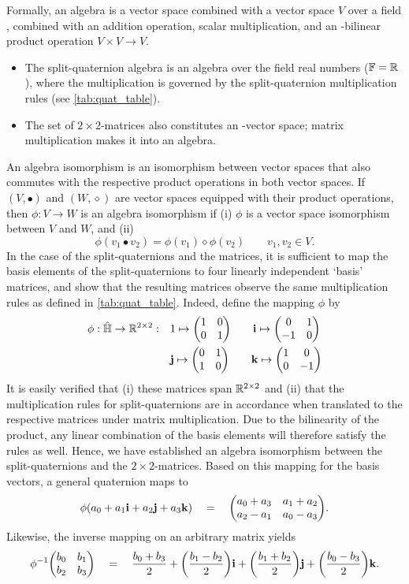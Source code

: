 Formally, an algebra is a vector space combined with a vector space $V$ over a field \field, combined with an addition operation, scalar multiplication, and an \field-bilinear product operation $V\times V \to V$. \cite{Schuller2014}
\begin{itemize}
    \item The split-quaternion algebra is an algebra over the field real numbers ($\mathbb{F} = \mathbb{R}$), where the multiplication is governed by the split-quaternion multiplication rules (see \cref{tab:quat_table}).
    \item The set of $2\times2$-matrices also constitutes an \real-vector space; matrix multiplication makes it into an algebra.
\end{itemize}
An algebra isomorphism is an isomorphism between vector spaces that also commutes with the respective product operations in both vector spaces. If $(V, \bullet)$ and $(W, \diamond)$ are vector spaces equipped with their product operations, then $\phi: V \to W$ is an algebra isomorphism if (i) $\phi$ is a vector space isomorphism between $V$ and $W$, and (ii)
$$ \phi(v_1 \bullet v_2) = \phi(v_1)\diamond\phi(v_2) \qquad v_1, v_2 \in V. $$
In the case of the split-quaternions and the matrices, it is sufficient to map the basis elements of the split-quaternions to four linearly independent `basis' matrices, and show that the resulting matrices observe the same multiplication rules as defined in \cref{tab:quat_table}. Indeed, define the mapping $\phi$ by 
\begin{equation}
    \begin{split}
        \phi: \spquaternions \to \real^{2\times2}: \quad &  
         1 \mapsto  \mqty(1 & 0 \\ 0 & 1) \qquad
        \quati \mapsto  \mqty(0 & 1 \\  -1 & 0) \\
        & \quatj \mapsto  \mqty(0 & 1 \\  1 & 0)\qquad 
        \quatk \mapsto  \mqty(1 & 0 \\  0 & -1) \\
    \end{split}
\end{equation}
It is easily verified that (i) these matrices span $\mathbb{R}^{2\times2}$ and (ii) that the multiplication rules for split-quaternions are in accordance when translated to the respective matrices under matrix multiplication. Due to the bilinearity of the product, any linear combination of the basis elements will therefore satisfy the rules as well. Hence, we have established an algebra isomorphism between the split-quaternions and the $2\times 2$-matrices. Based on this mapping for the basis vectors, a general quaternion maps to 
$$ \phi(\quat{a_0}{a_1}{a_2}{a_3}) \quad = \quad \mqty(a_0 + a_3 & a_1 + a_2 \\ a_2 - a_1 & a_0 - a_3). $$
Likewise, the inverse mapping on an arbitrary matrix yields
$$ \phi^{-1}\mqty(b_0 & b_1 \\ b_2 & b_3) \quad = \quad \quat{\frac{b_0 + b_3}{2}}{\qty(\frac{b_1 - b_2}{2})}{\qty(\frac{b_1 + b_2}{2})}{\qty(\frac{b_0 - b_3}{2})}.$$

